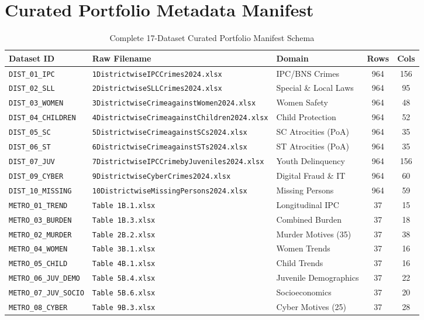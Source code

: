 \documentclass[12pt,a4paper]{report}
\begin{document}
\appendix
\chapter{Curated Portfolio Metadata Manifest}
\label{app:manifest}

\begin{table}[h]
\centering
\small
\caption{Complete 17-Dataset Curated Portfolio Manifest Schema}
\begin{tabular}{lllcc}
\toprule
\textbf{Dataset ID} & \textbf{Raw Filename} & \textbf{Domain} & \textbf{Rows} & \textbf{Cols} \\
\midrule
\texttt{DIST\_01\_IPC} & \texttt{1DistrictwiseIPCCrimes2024.xlsx} & IPC/BNS Crimes & 964 & 156 \\
\texttt{DIST\_02\_SLL} & \texttt{2DistrictwiseSLLCrimes2024.xlsx} & Special \& Local Laws & 964 & 95 \\
\texttt{DIST\_03\_WOMEN} & \texttt{3DistrictwiseCrimeagainstWomen2024.xlsx} & Women Safety & 964 & 48 \\
\texttt{DIST\_04\_CHILDREN} & \texttt{4DistrictwiseCrimeagainstChildren2024.xlsx} & Child Protection & 964 & 52 \\
\texttt{DIST\_05\_SC} & \texttt{5DistrictwiseCrimeagainstSCs2024.xlsx} & SC Atrocities (PoA) & 964 & 35 \\
\texttt{DIST\_06\_ST} & \texttt{6DistrictwiseCrimeagainstSTs2024.xlsx} & ST Atrocities (PoA) & 964 & 35 \\
\texttt{DIST\_07\_JUV} & \texttt{7DistrictwiseIPCCrimebyJuveniles2024.xlsx} & Youth Delinquency & 964 & 156 \\
\texttt{DIST\_09\_CYBER} & \texttt{9DistrictwiseCyberCrimes2024.xlsx} & Digital Fraud \& IT & 964 & 60 \\
\texttt{DIST\_10\_MISSING} & \texttt{10DistrictwiseMissingPersons2024.xlsx} & Missing Persons & 964 & 59 \\
\midrule
\texttt{METRO\_01\_TREND} & \texttt{Table 1B.1.xlsx} & Longitudinal IPC & 37 & 15 \\
\texttt{METRO\_03\_BURDEN} & \texttt{Table 1B.3.xlsx} & Combined Burden & 37 & 18 \\
\texttt{METRO\_02\_MURDER} & \texttt{Table 2B.2.xlsx} & Murder Motives (35) & 37 & 38 \\
\texttt{METRO\_04\_WOMEN} & \texttt{Table 3B.1.xlsx} & Women Trends & 37 & 16 \\
\texttt{METRO\_05\_CHILD} & \texttt{Table 4B.1.xlsx} & Child Trends & 37 & 16 \\
\texttt{METRO\_06\_JUV\_DEMO} & \texttt{Table 5B.4.xlsx} & Juvenile Demographics & 37 & 22 \\
\texttt{METRO\_07\_JUV\_SOCIO} & \texttt{Table 5B.6.xlsx} & Socioeconomics & 37 & 20 \\
\texttt{METRO\_08\_CYBER} & \texttt{Table 9B.3.xlsx} & Cyber Motives (25) & 37 & 28 \\
\bottomrule
\end{tabular}
\end{table}
\end{document}
